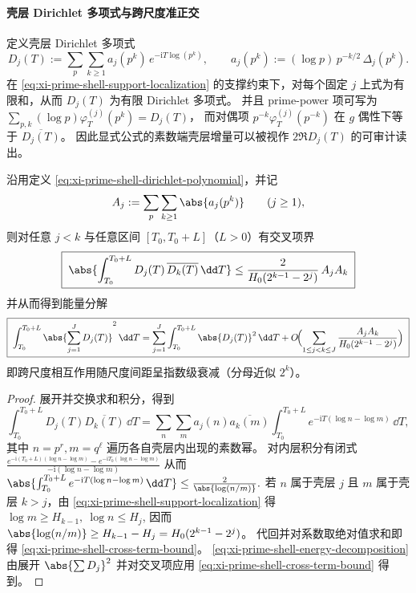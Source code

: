 \paragraph{壳层 Dirichlet 多项式与跨尺度准正交}
定义壳层 Dirichlet 多项式
\begin{equation}\label{eq:xi-prime-shell-dirichlet-polynomial}
D_j(T):=\sum_{p}\sum_{k\ge 1}a_j(p^k)\,e^{-\mathrm{i}T\log(p^k)},
\qquad
a_j(p^k):=(\log p)\,p^{-k/2}\,\Delta_j(p^k).
\end{equation}
在 \eqref{eq:xi-prime-shell-support-localization} 的支撑约束下，对每个固定 \(j\) 上式为有限和，从而 \(D_j(T)\) 为有限 Dirichlet 多项式。
并且 prime-power 项可写为
\(
\sum_{p,k}(\log p)\varphi_T^{(j)}(p^k)=D_j(T)
\)，
而对偶项 \(p^{-k}\varphi_T^{(j)}(p^{-k})\) 在 \(g\) 偶性下等于 \(\overline{D_j(T)}\)。
因此显式公式的素数端壳层增量可以被视作 \(2\Re D_j(T)\) 的可审计读出。

\begin{proposition}[壳层增量在时间平均下的准正交性]\label{prop:xi-prime-shell-quasi-orthogonality}
沿用定义 \eqref{eq:xi-prime-shell-dirichlet-polynomial}，并记
\[
A_j:=\sum_{p}\sum_{k\ge 1}\abs{a_j(p^k)}\qquad(j\ge 1),
\]
则对任意 \(j<k\) 与任意区间 \([T_0,T_0+L]\)（\(L>0\)）有交叉项界
\begin{equation}\label{eq:xi-prime-shell-cross-term-bound}
\boxed{\;
\abs{\int_{T_0}^{T_0+L}D_j(T)\,\overline{D_k(T)}\,\dd T}
\le
\frac{2}{H_0(2^{k-1}-2^{j})}\,A_jA_k\;}
\end{equation}
并从而得到能量分解
\begin{equation}\label{eq:xi-prime-shell-energy-decomposition}
\boxed{\;
\int_{T_0}^{T_0+L}\abs{\sum_{j=1}^{J}D_j(T)}^2\,\dd T
=
\sum_{j=1}^{J}\int_{T_0}^{T_0+L}\abs{D_j(T)}^2\,\dd T
+O\!\Bigl(\sum_{1\le j<k\le J}\frac{A_jA_k}{H_0(2^{k-1}-2^j)}\Bigr)\;}
\end{equation}
即跨尺度相互作用随尺度间距呈指数级衰减（分母近似 \(2^k\)）。
\end{proposition}

\begin{proof}
展开并交换求和积分，得到
\[
\int_{T_0}^{T_0+L}D_j(T)\overline{D_k(T)}\,\dd T
=\sum_{n}\sum_{m}a_j(n)\overline{a_k(m)}\int_{T_0}^{T_0+L}e^{-\mathrm{i}T(\log n-\log m)}\,\dd T,
\]
其中 \(n=p^r,m=q^\ell\) 遍历各自壳层内出现的素数幂。
对内层积分有闭式
\(
\frac{e^{-\mathrm{i}(T_0+L)(\log n-\log m)}-e^{-\mathrm{i}T_0(\log n-\log m)}}{-\mathrm{i}(\log n-\log m)}
\)
从而
\(
\abs{\int_{T_0}^{T_0+L}e^{-\mathrm{i}T(\log n-\log m)}\,\dd T}\le \frac{2}{\abs{\log(n/m)}}.
\)
若 \(n\) 属于壳层 \(j\) 且 \(m\) 属于壳层 \(k>j\)，由 \eqref{eq:xi-prime-shell-support-localization} 得
\(
\log m\ge H_{k-1},\ \log n\le H_j
\),
因而
\(
\abs{\log(n/m)}\ge H_{k-1}-H_j=H_0(2^{k-1}-2^j)
\)。
代回并对系数取绝对值求和即得 \eqref{eq:xi-prime-shell-cross-term-bound}。
\eqref{eq:xi-prime-shell-energy-decomposition} 由展开 \(\abs{\sum D_j}^2\) 并对交叉项应用 \eqref{eq:xi-prime-shell-cross-term-bound} 得到。
\end{proof}

